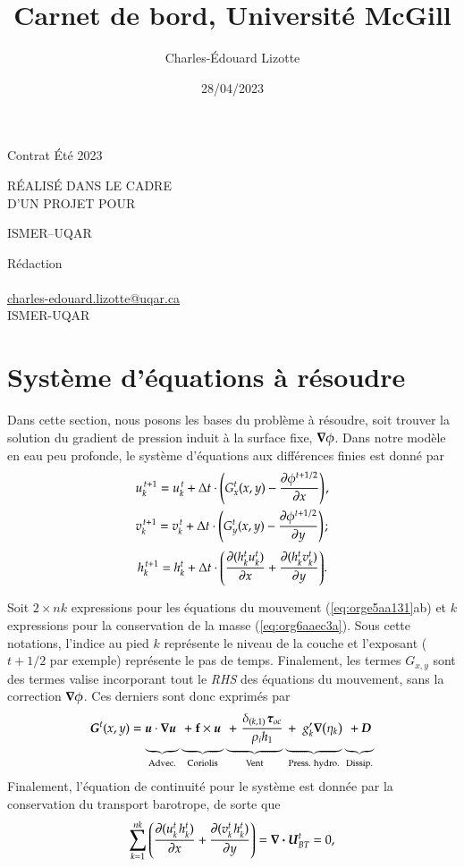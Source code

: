 \documentclass[10pt]{article}
\author{Charles-Édouard Lizotte}
\date{28/04/2023}
\title{Carnet de bord, Université McGill}
\makeatletter
\numberwithin{equation}{section}
\newcommand{\uu}{\vb*{u}}
\newcommand{\bigno}{\vphantom{\qty(\frac{d}{q})}}
\newcommand{\pt}{\hspace{1pt}}
\newcommand{\mytitlepage}{
\begin{titlepage}
\begin{center}
{\Large Contrat Été 2023 \par}
\vspace{2cm}
{\Large \MakeUppercase{\thetitle} \par}
\vspace{2cm}
RÉALISÉ DANS LE CADRE\\ D'UN PROJET POUR \par
\vspace{2cm}
{\Large ISMER--UQAR \par}
\vspace{2cm}
{\thedate}
\end{center}
\vfill
Rédaction \\
{\theauthor}\\
\url{charles-edouard.lizotte@uqar.ca}\\
ISMER-UQAR
\end{titlepage}
}
\makeatother
\begin{document}
\mytitlepage
\tableofcontents\newpage

\section{Système d'équations à résoudre}
\label{sec:org004efc3}

Dans cette section, nous posons les bases du problème à résoudre, soit trouver la solution du gradient de pression induit à la surface fixe, \(\gradient \phi\).
Dans notre modèle en eau peu profonde, le système d'équations aux différences finies est donné par
\begin{subequations}
\label{eq:orge5aa131}
\begin{align}
&u^{\pt t+1}_k = u^{\pt t}_k + \Delta t \cdot \qty(G^t_x(x,y) - \pdv{\phi^{t+1/2}}{x})\pt,\\
&v^{\pt t+1}_k = v^{\pt t}_k + \Delta t \cdot \qty(G^t_y(x,y) - \pdv{\phi^{t+1/2}}{y})\pt;
\end{align}
\end{subequations}
\begin{equation}
\label{eq:org6aaec3a}
h^{\pt t+1}_k = h^t_k + \Delta t \cdot \qty(\pdv{(h^t_k u^t_k)}{x} + \pdv{(h^t_k v^t_k)}{y}).
\end{equation}

Soit \(2 \times nk\) expressions pour les équations du mouvement (\ref{eq:orge5aa131}ab) et \(k\) expressions pour la conservation de la masse (\ref{eq:org6aaec3a}). 
Sous cette notations, l'indice au pied \(k\) représente le niveau de la couche et l'exposant (\(t+1/2\) par exemple) représente le pas de temps.
Finalement, les termes \(G_{x,y}\) sont des termes valise incorporant tout le \emph{RHS} des équations du mouvement, sans la correction \(\gradient \phi\).
Ces derniers sont donc exprimés par
\begin{equation}
\vb*{G}^t(x,y) =
\underbrace{ \bigno\uu \cdot \gradient{\uu}\ }_\text{Advec.}
\underbrace{ \bigno + \vb{f}\times \uu\ }_\text{Coriolis} 
\underbrace{ \bigno+\pt \frac{\delta_{(k,1)}\pt \boldsymbol{\tau}_{oc}}{\rho_i h_1}}_\text{Vent}
\underbrace{ \bigno+\ g'_{k} \gradient(\eta_k)}_\text{Press. hydro.}
\underbrace{ \bigno+ \vb*{D}}_\text{Dissip.}
\end{equation}
Finalement, l'équation de continuité pour le système est donnée par la conservation du transport barotrope, de sorte que
\begin{equation}
\label{eq:orgc8810b0}
\sum_{k=1}^{nk}  \qty(\pdv{(u^t_k\pt h^t_k)}{x} + \pdv{(v^t_k\pt h^t_k)}{y}) = \div{\vb*{U}^t_{BT}} = 0,
\end{equation}
\end{document}
